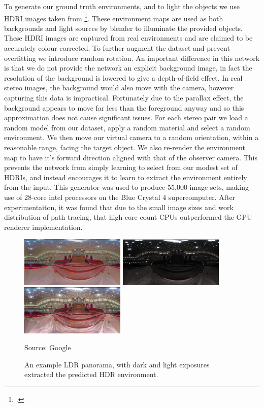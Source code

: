 \documentclass[ %
                    author={Gavin Parker},
                supervisor={Dr. Neill Campbell},
                    degree={MEng},
                     title={Deep Siamese Networks for Illumination Estimation from Stereo Images},
                  subtitle={},
                      type={research},
                      year={2018} ]{dissertation}
\begin{document}
\newline
To generate our ground truth environments, and to light the objects we use HDRI images taken from \footcite{https://hdrihaven.com/}. These environment maps are used as both backgrounds and light sources by blender to illuminate the provided objects. These HDRI images are captured from real environments and are claimed to be accurately colour corrected. To further augment the dataset and prevent overfitting we introduce random rotation. An important difference in this network is that we do not provide the network an explicit background image, in fact the resolution of the background is lowered to give a depth-of-field effect. In real stereo images, the background would also move with the camera, however capturing this data is impractical. Fortunately due to the parallax effect, the background appears to move far less than the foreground anyway and so this approximation does not cause significant issues. For each stereo pair we load a random model from our dataset, apply a random material and select a random environment. We then move our virtual camera to a random orientation, within a reasonable range, facing the target object. We also re-render the environment map to have it's forward direction aligned with that of the observer camera. This prevents the network from simply learning to select from our modest set of HDRIs, and instead encourages it to learn to extract the environment entirely from the input. This generator was used to produce 55,000 image sets, making use of 28-core intel processors on the Blue Crystal 4 supercomputer. After experimentaiton, it was found that due to the small image sizes and work distribution of path tracing, that high core-count CPUs outperformed the GPU renderer implementation.
\begin{figure}
\center
\includegraphics[width=5cm]{images/google_example/original}
\includegraphics[width=5cm]{images/google_example/dark}
\includegraphics[width=5cm]{images/google_example/bright}
\caption{An example LDR panorama, with dark and light exposures extracted the predicted HDR environment.}\label{fig:google}
Source: Google
\end{figure}
\end{document}
